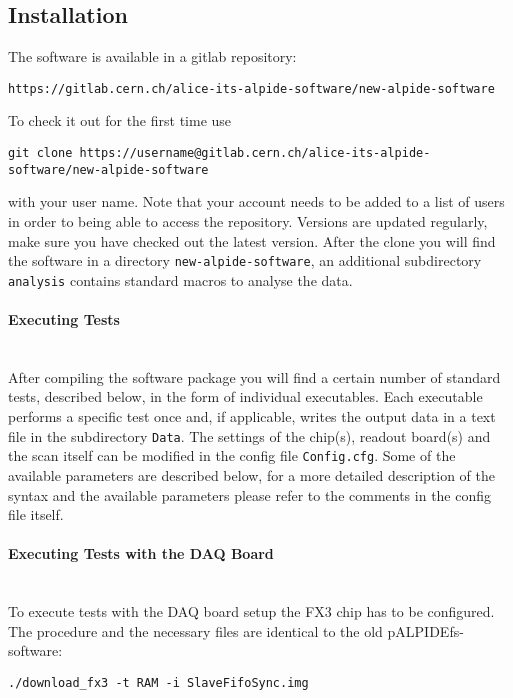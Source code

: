 \documentclass{article}
\begin{document}
\subsection{Installation}
The software is available in a gitlab repository:

\begin{lstlisting}
https://gitlab.cern.ch/alice-its-alpide-software/new-alpide-software
\end{lstlisting}

To check it out for the first time use

\begin{lstlisting}
git clone https://username@gitlab.cern.ch/alice-its-alpide-software/new-alpide-software
\end{lstlisting}

with your user name. Note that your account needs to be added to a
list of users in order to being able to access the repository.
Versions are updated regularly, make sure you have checked out the
latest version. After the clone you will find the software in a directory \texttt{new-alpide-software}, an additional subdirectory \texttt{analysis} contains standard macros to analyse the data.

\paragraph{Executing Tests}\hfill \\
After compiling the software package you will find a certain number of standard tests, described below, in the form of individual executables. Each executable performs a specific test once and, if applicable, writes the output data in a text file in the subdirectory \texttt{Data}. The settings of the chip(s), readout board(s) and the scan itself can be modified in the config file \texttt{Config.cfg}. Some of the available parameters are described below, for a more detailed description of the syntax and the available parameters please refer to the comments in the config file itself.



\paragraph{Executing Tests with the DAQ Board}\hfill \\
To execute tests with the DAQ board setup the FX3 chip has to be configured. The procedure and the necessary files are identical to the old pALPIDEfs-software:
\begin{verbatim}
./download_fx3 -t RAM -i SlaveFifoSync.img
\end{verbatim}
\end{document}
